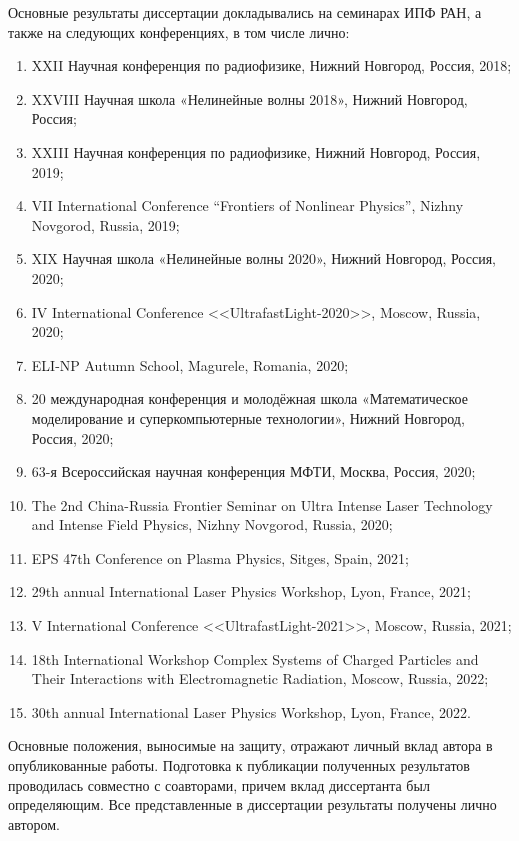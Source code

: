 \vspace{0.25cm}
{\probation}
Основные результаты диссертации докладывались на семинарах ИПФ РАН, а также на следующих конференциях, в том числе лично:
\begin{enumerate}
    \item XXII Научная конференция по радиофизике, Нижний Новгород, Россия, 2018;
    \item XXVIII Научная школа «Нелинейные волны 2018», Нижний Новгород, Россия;
    \item XXIII Научная конференция по радиофизике, Нижний Новгород, Россия, 2019;
    \item VII International Conference “Frontiers of Nonlinear Physics”, Nizhny Novgorod, Russia, 2019;
    \item XIX Научная школа «Нелинейные волны 2020», Нижний Новгород, Россия, 2020;
    \item IV International Conference <<UltrafastLight-2020>>, Moscow, Russia, 2020;
    \item ELI-NP Autumn School, Magurele, Romania, 2020;
    \item 20 международная конференция и молодёжная школа «Математическое моделирование и суперкомпьютерные технологии», Нижний Новгород, Россия, 2020;
    \item 63-я Всероссийская научная конференция МФТИ, Москва, Россия, 2020;
    \item The 2nd China-Russia Frontier Seminar on Ultra Intense Laser Technology and Intense Field Physics, Nizhny Novgorod, Russia, 2020;
    \item EPS 47th Conference on Plasma Physics, Sitges, Spain, 2021;
    \item 29th annual International Laser Physics Workshop, Lyon, France, 2021;
    \item V International Conference <<UltrafastLight-2021>>, Moscow, Russia, 2021;
    \item 18th International Workshop Complex Systems of Charged Particles and Their Interactions with Electromagnetic Radiation, Moscow, Russia, 2022;
    \item 30th annual International Laser Physics Workshop, Lyon, France, 2022.
\end{enumerate}

\vspace{0.25cm}
{\contribution} Основные положения, выносимые на защиту, отражают личный вклад автора в опубликованные работы.
Подготовка к публикации полученных результатов проводилась совместно с соавторами, причем вклад диссертанта был определяющим.
Все представленные в диссертации результаты получены лично автором.

